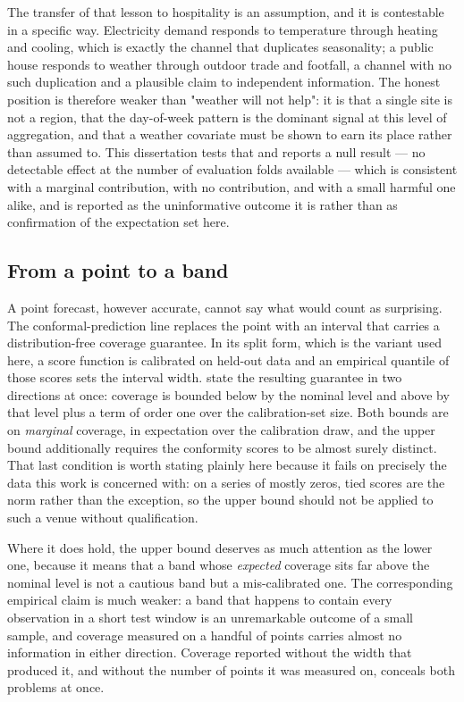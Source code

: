 The transfer of that lesson to hospitality is an assumption, and it is
contestable in a specific way. Electricity demand responds to temperature
through heating and cooling, which is exactly the channel that duplicates
seasonality; a public house responds to weather through outdoor trade and
footfall, a channel with no such duplication and a plausible claim to
independent information. The honest position is therefore weaker than "weather
will not help": it is that a single site is not a region, that the day-of-week
pattern is the dominant signal at this level of aggregation, and that a weather
covariate must be shown to earn its place rather than assumed to. This
dissertation tests that and reports a null result --- no detectable effect at
the number of evaluation folds available --- which is consistent with a
marginal contribution, with no contribution, and with a small harmful one
alike, and is reported as the uninformative outcome it is rather than as
confirmation of the expectation set here.

\subsection*{From a point to a band}

A point forecast, however accurate, cannot say what would count as surprising.
The conformal-prediction line replaces the point with an interval that carries
a distribution-free coverage guarantee. In its split form, which is the
variant used here, a score function is calibrated on held-out data and an
empirical quantile of those scores sets the interval width.
\citet{angelopoulos_conformal_2023} state the resulting guarantee in two
directions at once: coverage is bounded below by the nominal level and above
by that level plus a term of order one over the calibration-set size. Both
bounds are on \emph{marginal} coverage, in expectation over the calibration
draw, and the upper bound additionally requires the conformity scores to be
almost surely distinct. That last condition is worth stating plainly here
because it fails on precisely the data this work is concerned with: on a series
of mostly zeros, tied scores are the norm rather than the exception, so the
upper bound should not be applied to such a venue without qualification.

Where it does hold, the upper bound deserves as much attention as the lower
one, because it means that a band whose \emph{expected} coverage sits far above
the nominal level is not a cautious band but a mis-calibrated one. The
corresponding empirical claim is much weaker: a band that happens to contain
every observation in a short test window is an unremarkable outcome of a small
sample, and coverage measured on a handful of points carries almost no
information in either direction. Coverage reported without the width that
produced it, and without the number of points it was measured on, conceals both
problems at once.


